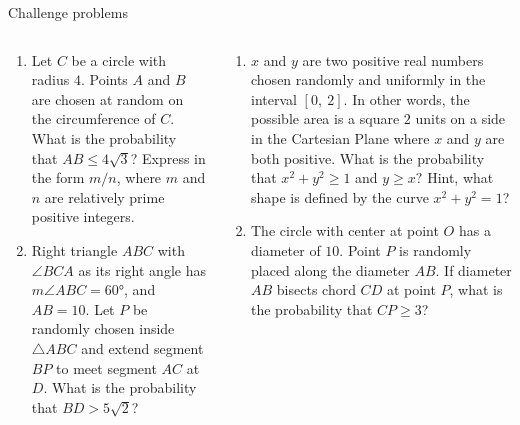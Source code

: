 \documentclass[9pt,aspectratio=169]{beamer}
\begin{document}
\begin{frame}{Challenge problems}
  \begin{columns}[T]
    \begin{column}{0.5\textwidth}
      \begin{enumerate}
        \item Let $C$ be a circle with radius $4$.  Points $A$ and $B$ are chosen at random on the circumference of $C$.  What is the probability that $AB \leq 4\sqrt{3}$? Express in the form $m/n$, where $m$ and $n$ are relatively prime positive integers.

        \item Right triangle $ABC$ with $\angle BCA$ as its right angle has $m\angle ABC = 60°$, and $AB = 10$.  Let $P$ be randomly chosen inside $\triangle ABC$ and extend segment $BP$ to meet segment $AC$ at $D$.  What is the probability that $BD > 5\sqrt{2}$? 
        \seti
      \end{enumerate}
    \end{column}
    \begin{column}{0.5\textwidth}
      \begin{enumerate}
        \conti
        \item $x$ and $y$ are two positive real numbers chosen randomly and uniformly in the interval $[0,\ 2].$  In other words, the possible area is a square $2$ units on a side in the Cartesian Plane where $x$ and $y$ are both positive.  What is the probability that $x^2 + y^2 \geq 1$ and $y \geq x?$  Hint, what shape is defined by the curve $x^2 + y^2 = 1$?

        \item The circle with center at point $O$ has a diameter of $10$.  Point $P$ is randomly placed along the diameter $AB$.  If diameter $AB$ bisects chord $CD$ at point $P$, what is the probability that $CP \geq 3$?
        
      \end{enumerate}
    \end{column}
  \end{columns}
\end{frame}


\end{document}
